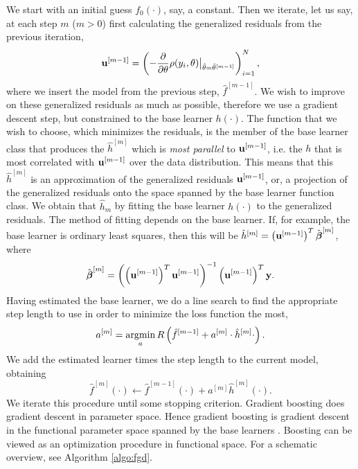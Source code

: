 We start with an initial guess $f_0(\cdot)$, say, a constant. Then we iterate, let us say, at each step $m$ ($m>0$) first calculating the generalized residuals from the previous iteration,
\begin{equation}
    \mathbf{u}^{[m-1]}=\left(-\frac{\partial}{\partial \theta}\rho(y_i, \theta)\big\rvert_{\hat{\theta}=\hat{\theta}^{[m-1]}}\right)_{i=1}^N,
\end{equation}
where we insert the model from the previous step, $\hat{f}^{[m-1]}$. We wish to improve on these generalized residuals as much as possible, therefore we use a gradient descent step, but constrained to the base learner $h(\cdot)$. The function that we wish to choose, which minimizes the residuals, is the member of the base learner class that produces the $\hat{h}^{[m]}$ which is \textit{most parallel} to $\mathbf{u}^{[m-1]}$, i.e. the $h$ that is most correlated with $\mathbf{u}^{[m-1]}$ over the data distribution. This means that this $\hat{h}^{[m]}$ is an approximation of the generalized residuals $\mathbf{u}^{[m-1]}$, or, a projection of the generalized residuals onto the space spanned by the base learner function class. We obtain that $\hat{h}_m$ by fitting the base learner $h(\cdot)$ to the generalized residuals. The method of fitting depends on the base learner. If, for example, the base learner is ordinary least squares, then this will be $\hat{h}^{[m]}=\left(\mathbf{u}^{[m-1]}\right)^T\hat{\boldsymbol{\beta}}^{[m]}$, where
\begin{equation}
    \hat{\boldsymbol{\beta}}^{[m]}=\left(\left(\mathbf{u}^{[m-1]}\right)^T\mathbf{u}^{[m-1]}\right)^{-1}\left(\mathbf{u}^{[m-1]}\right)^T\mathbf{y}.
\end{equation}
Having estimated the base learner, we do a line search to find the appropriate step length to use in order to minimize the loss function the most,
\begin{equation}
    a^{[m]}=\operatorname*{argmin}_{a}R\left(\hat{f}^{[m-1]}+a^{[m]}\cdot\hat{h}^{[m]}{\cdot}\right).
\end{equation}
We add the estimated learner times the step length to the current model, obtaining
\begin{equation}
    \hat{f}^{[m]}(\cdot)\gets \hat{f}^{[m-1]}(\cdot)+a^{[m]}\hat{h}^{[m]}(\cdot).
\end{equation}
We iterate this procedure until some stopping criterion. Gradient boosting does gradient descent in parameter space. Hence gradient boosting is gradient descent in the functional parameter space spanned by the base learners \citep{friedman2001}. Boosting can be viewed as an optimization procedure in functional space. For a schematic overview, see Algorithm \ref{algo:fgd}.
